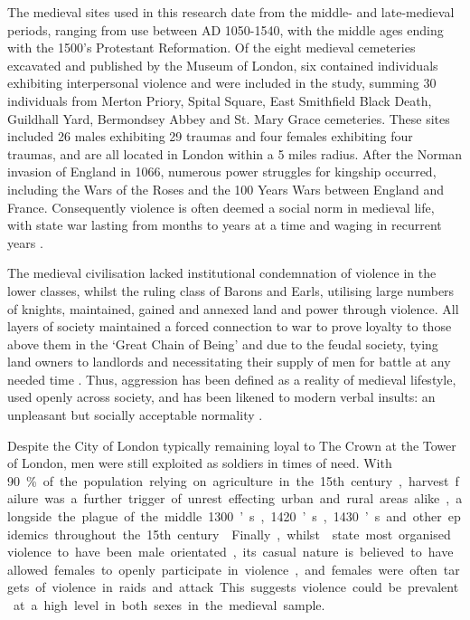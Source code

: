 The medieval sites used in this research date from the middle- and late-medieval periods, ranging from use between AD 1050-1540, with the middle ages ending with the 1500’s Protestant Reformation.  Of the eight medieval cemeteries excavated and published by the Museum of London, six contained individuals exhibiting interpersonal violence and were included in the study, summing 30 individuals from Merton Priory, Spital Square, East Smithfield Black Death, Guildhall Yard, Bermondsey Abbey and St. Mary Grace cemeteries. These sites included 26 males exhibiting 29 traumas and four females exhibiting four traumas, and are all located in London within a 5 miles radius.  
After the Norman invasion of England in 1066, numerous power struggles for kingship occurred, including the Wars of the Roses and the 100 Years Wars between England and France.  Consequently violence is often deemed a social norm in medieval life, with state war lasting from months to years at a time and waging in recurrent years \parencites{allmand1988}{goodman1990}{turvey2010}.  

The medieval civilisation lacked institutional condemnation of violence in the lower classes, whilst the ruling class of Barons and Earls, utilising large numbers of knights, maintained, gained and annexed land and power through violence. All layers of society maintained a forced connection to war to prove loyalty to those above them in the ‘Great Chain of Being’ and due to the feudal society, tying land owners to landlords and necessitating their supply of men for battle at any needed time \parencite[8]{turvey2010}. 
Thus, aggression has been defined as a reality of medieval lifestyle, used openly across society, and has been likened to modern verbal insults: an unpleasant but socially acceptable normality \parencite{meyerson2004}.

Despite the City of London typically remaining loyal to The Crown at the Tower of London, men were still exploited as soldiers in times of need. With \SI{90}\percent of the population relying on agriculture in the 15th century, 
harvest failure was a further trigger of unrest effecting urban and rural areas alike, alongside the plague of the middle 1300’s, 1420’s, 1430’s and other epidemics throughout the 15th century \parencite{turvey2010}. 
Finally, whilst \textcite{meyerson2004} state most organised violence to have been male orientated, its casual nature is believed to have allowed females to openly participate in violence, and females were often targets of violence in raids and attack. This suggests violence could be prevalent at a high level in both sexes in the medieval sample.

